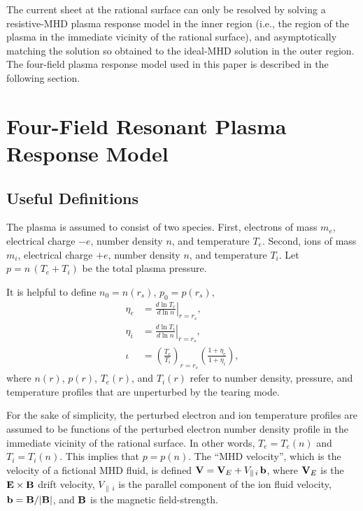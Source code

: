 \documentclass[12pt,prb,aps]{revtex4-1}
\begin{document}
The current sheet at the rational surface can only be resolved by solving  a resistive-MHD plasma response model
in the  inner region (i.e., the region of the plasma in the immediate vicinity of the rational surface), 
and asymptotically matching the solution so obtained to the ideal-MHD solution in the outer region. The four-field 
plasma response model used in this paper is
described in the following section. 

\section{Four-Field Resonant Plasma Response Model}\label{sfour}
\subsection{Useful Definitions}
The plasma is assumed to consist of two species. First, electrons of mass $m_e$, electrical charge $-e$, 
number density $n$, and temperature $T_e$.  Second, ions of mass $m_i$, electrical charge $+e$,  
number density $n$, and temperature $T_i$. Let $p=n\,(T_e+T_i)$ be the total plasma pressure. 

It is helpful to define $n_0 = n(r_s)$, $p_0= p(r_s)$,
\begin{align}
\eta_e &=\left.\frac{d\ln T_e}{d\ln n}\right|_{r=r_s},\label{e211}\\[0.5ex]
\eta_i &= \left.\frac{d\ln T_i}{d\ln n}\right|_{r=r_s},\\[0.5ex]
\iota&= \left(\frac{T_e}{T_i}\right)_{r=r_s}\left(\frac{1+\eta_e}{1+\eta_i}\right),\label{e213}
\end{align}
where $n(r)$, $p(r)$, $T_e(r)$, and $T_i(r)$ refer to
number density, pressure, and temperature profiles that are unperturbed by the tearing mode. 

For the sake of simplicity, the perturbed electron and ion temperature profiles are assumed to be functions of
the perturbed electron number density profile in the immediate vicinity of the rational surface. In other words, $T_e=T_e(n)$ and $T_i=T_i(n)$. This
implies that $p=p(n)$. 
The ``MHD velocity'', which is the velocity of a
fictional MHD fluid, is defined ${\bf V}={\bf V}_E + V_{\parallel\,i}\,{\bf b}$, where ${\bf V}_E$ is the
${\bf E}\times{\bf B}$ drift velocity, $V_{\parallel\,i}$ is the parallel component of the ion fluid
velocity, ${\bf b}= {\bf B}/|{\bf B}|$, and ${\bf B}$ is the magnetic field-strength.
\end{document}
